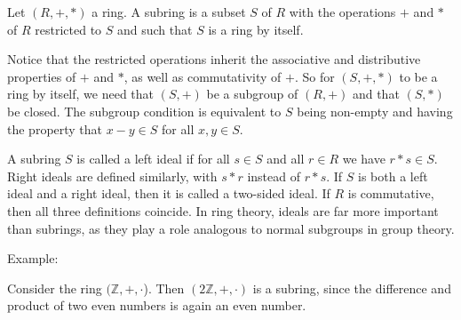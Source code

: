 \documentclass[12pt]{article}
\newcommand{\Z}{\mathbb{Z}}
\begin{document}

Let $(R,+,*)$ a ring. A subring is a subset $S$ of $R$ with the operations $+$ and $*$ of $R$ restricted to $S$ and such that $S$ is a ring by itself.

Notice that the restricted operations inherit the associative and distributive properties of $+$ and $*$, as well as commutativity of $+$.
So for $(S,+,*)$ to be a ring by itself, we need that $(S,+)$ be a subgroup of $(R,+)$ and that $(S,*)$ be closed.
The subgroup condition is equivalent to $S$ being non-empty and having the property that $x-y\in S$ for all $x,y\in S$.

A subring $S$ is called a left ideal if for all $s\in S$ and all $r\in R$ we have $r*s\in S$. Right ideals are defined similarly, with $s*r$ instead of $r*s$.
If $S$ is both a left ideal and a right ideal, then it is called a two-sided ideal. If $R$ is commutative, then all three definitions coincide. In ring theory, ideals are far more important than subrings, as they play a role analogous to normal subgroups in group theory.

Example:

Consider the ring $(\Z,+,\cdot$). Then $(2\Z,+,\cdot)$ is a subring, since the difference and product of two even numbers is again an even number.
\end{document}
